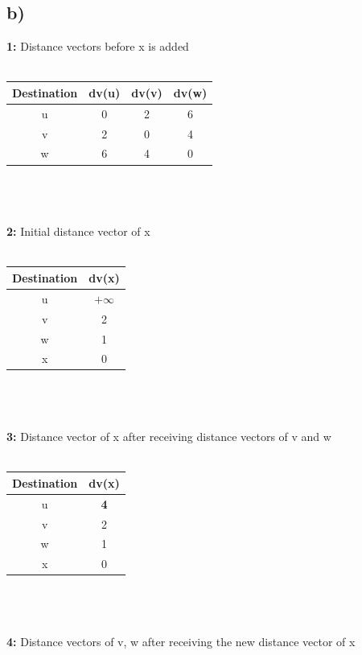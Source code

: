 \documentclass[12pt, a4paper]{article}
\begin{document}
\subsection*{b)}
\textbf{1:} Distance vectors before x is added \\ \\
    \begin{tabular}{||c c c c||} 
     \hline
     Destination & dv(u) & dv(v) & dv(w) \\ [0.5ex] 
     \hline\hline
     u & 0 & 2 & 6 \\ 
     \hline
     v & 2 & 0 & 4 \\
     \hline
     w & 6 & 4 & 0 \\
     \hline
    \end{tabular} \\ \\ \\
\textbf{2:} Initial distance vector of x \\ \\
    \begin{tabular}{||c c||} 
     \hline
     Destination & dv(x) \\ [0.5ex] 
     \hline\hline
     u & \(+\infty\) \\ 
     \hline
     v & 2 \\
     \hline
     w & 1 \\
     \hline
     x & 0 \\
     \hline
    \end{tabular} \\ \\ \\
\textbf{3:} Distance vector of x after receiving distance vectors of v and w \\ \\
    \begin{tabular}{||c c||} 
     \hline
     Destination & dv(x) \\ [0.5ex] 
     \hline\hline
     u & \textbf{4} \\ 
     \hline
     v & 2 \\
     \hline
     w & 1 \\
     \hline
     x & 0 \\
     \hline
    \end{tabular} \\ \\ \\
\textbf{4:} Distance vectors of v, w after receiving the new distance vector of x \\ \\
\end{document}
